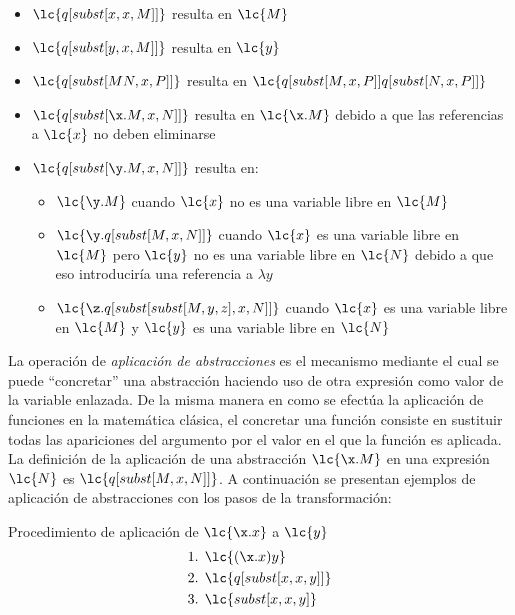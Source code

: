 \begin{itemize}
\item \(\lc{q[subst[x,x,M]]}\) resulta en \(\lc{M}\)
\item \(\lc{q[subst[y,x,M]]}\) resulta en \(\lc{y}\)
\item \(\lc{q[subst[M N, x, P]]}\) resulta en \(\lc{q[subst[M, x, P]] q[subst[N,
    x, P]]}\)
\item \(\lc{q[subst[\x.M, x, N]]}\) resulta en \(\lc{\x.M}\) debido a que las
  referencias a \(\lc{x}\) no deben eliminarse
\item \(\lc{q[subst[\y.M, x, N]]}\) resulta en:
  \begin{itemize}
  \item \(\lc{\y.M}\) cuando \(\lc{x}\) no es una variable libre en \(\lc{M}\)
  \item \(\lc{\y.q[subst[M, x, N]]}\) cuando \(\lc{x}\) es una variable libre en
    \(\lc{M}\) pero \(\lc{y}\) no es una variable libre en \(\lc{N}\) debido a que
    eso introduciría una referencia a \(\lambda y\)
  \item \(\lc{\z.q[subst[subst[M,y,z],x,N]]}\) cuando \(\lc{x}\) es una variable
    libre en \(\lc{M}\) y \(\lc{y}\) es una variable libre en \(\lc{N}\)
  \end{itemize}
\end{itemize}

La operación de \emph{aplicación de abstracciones} es el mecanismo mediante el cual
se puede ``concretar'' una abstracción haciendo uso de otra expresión como valor
de la variable  enlazada. De la misma manera en como se efectúa la
aplicación de funciones en la matemática clásica, el concretar una función
consiste en sustituir todas las apariciones del argumento por el valor en el que
la función es aplicada. \\

La definición de la aplicación de una abstracción \(\lc{\x.M}\) en una expresión
\(\lc{N}\) es \(\lc{q[subst[M,x,N]]}\). A continuación se presentan ejemplos de
aplicación de abstracciones con los pasos de la transformación: \\

\begin{ejemplo} Procedimiento de aplicación de \(\lc{\x.x}\) a \(\lc{y}\)
  \label{ejemplo:aplicacion3}
  \begin{align*}
    \text{1. } &\lc{(\x.x)y} \\
    \text{2. } &\lc{q[subst[x,x,y]]} \\
    \text{3. } &\lc{subst[x,x,y]}
  \end{align*}
\end{ejemplo}

